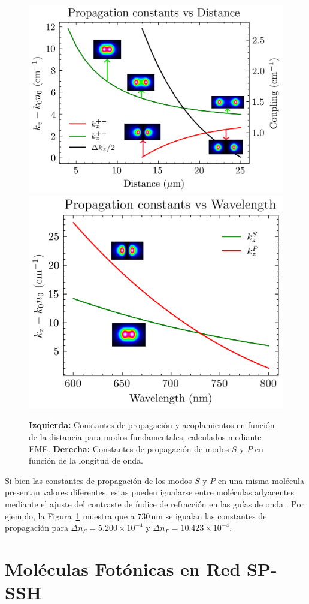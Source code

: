 \begin{figure}[H]
	\centering
	\includegraphics[width=0.46\linewidth]{codigo/dimol2/eigenvalues_vs_angle_1.png}
	\includegraphics[width=0.40\linewidth]{codigo/dimol3/eigenvalues_vs_wavelength.png}
	\caption[Propagación y acoplamientos en moléculas fotónicas]{
		\textbf{Izquierda:} Constantes de propagación y acoplamientos en función de la distancia para modos fundamentales, calculados mediante EME. 
		\textbf{Derecha:} Constantes de propagación de modos $S$ y $P$ en función de la longitud de onda.
		\label{fig:molecule-coup}}
\end{figure}

Si bien las constantes de propagación de los modos $S$ y $P$ en una misma molécula presentan valores diferentes, estas pueden igualarse entre moléculas adyacentes mediante el ajuste del contraste de índice de refracción en las guías de onda \citep{interorbital}. Por ejemplo, la Figura~\ref{fig:molecule-coup} muestra que a $730$\,nm se igualan las constantes de propagación para $\Delta n_S = 5.200 \times 10^{-4}$ y $\Delta n_P = 10.423 \times 10^{-4}$.

\section{Moléculas Fotónicas en Red SP-SSH}


